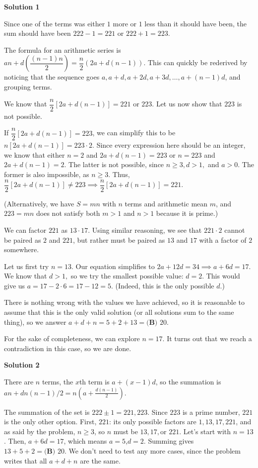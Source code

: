 \begin{enumerate}
\textbf{Solution 1}

Since one of the terms was either $1$  more or $1$ less than it should have been, the sum should have been $222-1=221$ or $222+1=223.$ 

 The formula for an arithmetic series is $an+d\left(\dfrac{(n-1)n}2\right)=\dfrac n2\left(2a+d(n-1)\right).$ This can quickly be rederived by noticing that the sequence goes $a,a+d,a+2d,a+3d,\dots,a+(n-1)d$, and grouping terms. 

 We know that $\dfrac n2[2a+d(n-1)]=221$ or $223$. Let us now show that $223$ is not possible. 

 If $\dfrac n2[2a+d(n-1)]=223$, we can simplify this to be $n[2a+d(n-1)]=223\cdot2.$ Since every expression here should be an integer, we know that either $n=2$ and $2a+d(n-1)=223$ or $n=223$ and $2a+d(n-1)=2.$ The latter is not possible, since $n\ge3,d>1,$ and $a>0.$ The former is also impossible, as $n\ge3.$ Thus, $\dfrac n2[2a+d(n-1)]\neq223\implies\dfrac n2[2a+d(n-1)]=221$. 

 (Alternatively, we have $S=mn$ with $n$ terms and arithmetic mean $m$, and $223=mn$ does not satisfy both $m > 1$ and $n > 1$ because it is prime.)

 We can factor $221$ as $13\cdot17$. Using similar reasoning, we see that $221\cdot2$ cannot be paired as $2$ and $221$, but rather must be paired as $13$ and $17$ with a factor of $2$ somewhere. 

 Let us first try $n=13.$ Our equation simplifies to $2a+12d=34\implies a+6d=17.$ We know that $d>1,$ so we try the smallest possible value: $d=2.$ This would give us $a=17-2\cdot6=17-12=5.$ (Indeed, this is the only possible $d$.)

 There is nothing wrong with the values we have achieved, so it is reasonable to assume that this is the only valid solution (or all solutions sum to the same thing), so we answer $a+d+n=5+2+13=\boxed{\textbf{(B) }20.}$ 

 For the sake of completeness, we can explore $n=17.$ It turns out that we reach a contradiction in this case, so we are done. 

 



\textbf{Solution 2}

There are $n$ terms, the $x$th term is $a+(x-1)d$, so the summation is $an+dn(n-1)/2=n(a+\frac{d(n-1)}{2})$.

 
The summation of the set is $222 \pm 1 = 221,223$. Since $223$ is a prime number, $221$ is the only other option. First, $221$: its only possible factors are $1,13,17,221$, and as said by the problem, $n\ge3$, so $n$ must be $13,17,$or $221$. Let's start with $n=13$. Then, $a+6d=17$, which means $a=5$,$d=2$. Summing gives $13+5+2=\boxed{\textbf{(B) }20}$. We don't need to test any more cases, since the problem writes that all $a+d+n$ are the same.


\end{enumerate}
